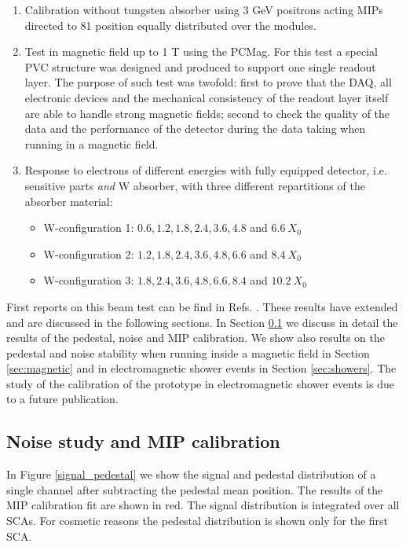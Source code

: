\documentclass[a4paper,11pt]{article}
\begin{document}
\begin{enumerate}
\item Calibration without tungsten absorber using 3 GeV positrons acting MIPs directed to 81 position equally distributed over the modules.
\item Test in magnetic field up to 1 T using the PCMag. For this test a special PVC structure was
  designed and produced to support one single readout layer.	
  The purpose of such test was twofold: first to prove that the DAQ, all electronic devices and the 
  mechanical consistency of the readout layer itself are able
  to handle strong magnetic fields; 
  second to check the quality of the data and the performance of the detector during the data taking when running
  in a magnetic field. 
  \item Response to electrons of different energies with fully equipped detector, i.e. sensitive parts {\it and} W absorber, with three different repartitions of the absorber material:
  \begin{itemize}
  \item W-configuration 1: $0.6,1.2,1.8,2.4,3.6,4.8$ and $6.6~X_{0}$
  \item W-configuration 2: $1.2,1.8,2.4,3.6,4.8,6.6$ and $8.4~X_{0}$
  \item W-configuration 3: $1.8,2.4,3.6,4.8,6.6,8.4$ and $10.2~X_{0}$
  \end{itemize}
\end{enumerate}

First reports on this beam test can be find in
Refs. \cite{Irles:2018uum,Irles:2018hcd}. These results have extended and
are discussed in the following sections. In Section \ref{sec:calib} we discuss in detail
the results of the pedestal, noise and MIP calibration.
We show also results on the pedestal and noise stability when running inside
a magnetic field in Section \ref{sec:magnetic} and in electromagnetic shower
events in Section \ref{sec:showers}. The study of the calibration of the prototype
in electromagnetic shower events is due to a future publication.

\subsection{Noise study and MIP calibration}
\label{sec:calib}

In Figure \ref{signal_pedestal} we show the signal and pedestal distribution of a single channel after
subtracting the pedestal mean position. The results of the MIP calibration fit are shown in red.
The signal distribution is integrated over all SCAs.
For cosmetic reasons the pedestal distribution is shown only for the first SCA.
\end{document}
